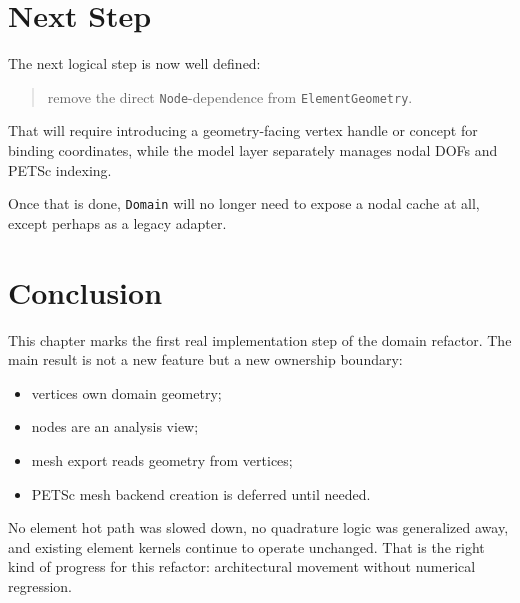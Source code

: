 \section{Next Step}
\label{sec:domain-vertex-transition-next}

The next logical step is now well defined:

\begin{quote}
remove the direct \texttt{Node}-dependence from \texttt{ElementGeometry}.
\end{quote}

That will require introducing a geometry-facing vertex handle or concept for
binding coordinates, while the model layer separately manages nodal DOFs and
PETSc indexing.

Once that is done, \texttt{Domain} will no longer need to expose a nodal cache
at all, except perhaps as a legacy adapter.


\section{Conclusion}
\label{sec:domain-vertex-transition-conclusion}

This chapter marks the first real implementation step of the domain refactor.
The main result is not a new feature but a new ownership boundary:

\begin{itemize}[nosep]
  \item vertices own domain geometry;
  \item nodes are an analysis view;
  \item mesh export reads geometry from vertices;
  \item PETSc mesh backend creation is deferred until needed.
\end{itemize}

No element hot path was slowed down, no quadrature logic was generalized away,
and existing element kernels continue to operate unchanged.  That is the right
kind of progress for this refactor: architectural movement without numerical
regression.
